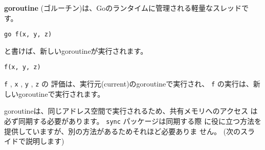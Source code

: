 \textbf{goroutine} (ゴルーチン)は、Goのランタイムに管理される軽量なスレッドです。

\begin{lstlisting}[numbers=none]
go f(x, y, z)
\end{lstlisting}
と書けば、新しいgoroutineが実行されます。

\begin{lstlisting}[numbers=none]
f(x, y, z)
\end{lstlisting}
\texttt{f} , \texttt{x} , \texttt{y} , \texttt{z} の
評価は、実行元(current)のgoroutineで実行され、 
\texttt{f} の実行は、新しいgoroutineで実行されます。

goroutineは、同じアドレス空間で実行されるため、共有メモリへのアクセス
は必ず同期する必要があります。 \texttt{sync} パッケージは同期する際
に役に立つ方法を提供していますが、別の方法があるためそれほど必要ありま
せん。 (次のスライドで説明します)